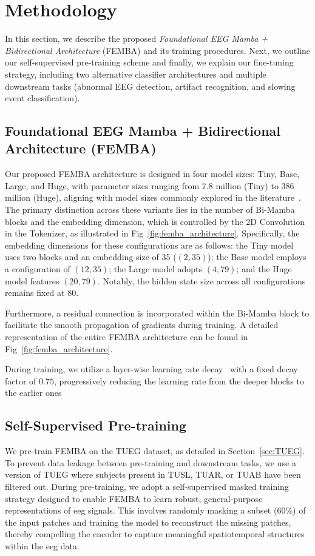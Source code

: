 \section{Methodology}
\label{sec:methods}
In this section, we describe the proposed \emph{Foundational EEG Mamba + Bidirectional Architecture} (FEMBA) and its training procedures. Next, we outline our self-supervised pre-training scheme and finally, we explain our fine-tuning strategy, including two alternative classifier architectures and multiple downstream tasks (abnormal EEG detection, artifact recognition, and slowing event classification).

\subsection{Foundational EEG Mamba + Bidirectional Architecture (FEMBA)}
Our proposed FEMBA architecture is designed in four model sizes: Tiny, Base, Large, and Huge, with parameter sizes ranging from 7.8 million (Tiny) to 386 million (Huge), aligning with model sizes commonly explored in the literature~\cite{jianglarge,chen2024eegformer}. The primary distinction across these variants lies in the number of Bi-Mamba blocks and the embedding dimension, which is controlled by the 2D Convolution in the Tokenizer, as illustrated in Fig~\ref{fig:femba_architecture}. Specifically, the embedding dimensions for these configurations are as follows: the Tiny model uses two blocks and an embedding size of 35 ($(2,35)$); the Base model employs a configuration of $(12,35)$; the Large model adopts $(4,79)$; and the Huge model features $(20,79)$. Notably, the hidden state size across all configurations remains fixed at 80.

Furthermore, a residual connection is incorporated within the Bi-Mamba block to facilitate the smooth propagation of gradients during training. A detailed representation of the entire FEMBA architecture can be found in Fig~\ref{fig:femba_architecture}.

During training, we utilize a layer-wise learning rate decay~\cite{ishii2017layer} with a fixed decay factor of $0.75$, progressively reducing the learning rate from the deeper blocks to the earlier ones

\subsection{Self-Supervised Pre-training}
\label{subsec:pretraining}
We pre-train FEMBA on the TUEG dataset, as detailed in Section~\ref{sec:TUEG}. To prevent data leakage between pre-training and downstream tasks, we use a version of TUEG where subjects present in TUSL, TUAR, or TUAB have been filtered out. During pre-training, we adopt a self-supervised masked training strategy designed to enable FEMBA to learn robust, general-purpose representations of \gls{eeg} signals. This involves randomly masking a subset (60\%) of the input patches and training the model to reconstruct the missing patches, thereby compelling the encoder to capture meaningful spatiotemporal structures within the \gls{eeg} data.

